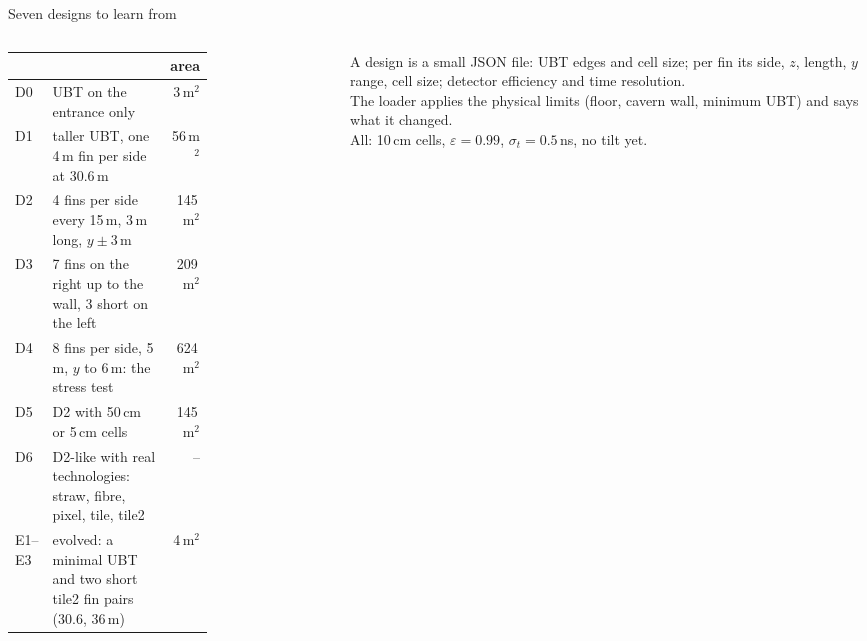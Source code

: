 \documentclass[aspectratio=169,10pt]{beamer}
\begin{document}
\begin{frame}{Seven designs to learn from}
  \begin{columns}[c]
    \begin{column}{0.55\textwidth}\footnotesize
      \begin{tabular}{@{}lp{0.62\linewidth}r@{}}
        \toprule
        & & area\\
        \midrule
        D0 & UBT on the entrance only & 3\,m$^2$\\
        D1 & taller UBT, one 4\,m fin per side at 30.6\,m & 56\,m$^2$\\
        D2 & 4 fins per side every 15\,m, 3\,m long, $y\pm3$\,m & 145\,m$^2$\\
        D3 & 7 fins on the right up to the wall, 3 short on the left & 209\,m$^2$\\
        D4 & 8 fins per side, 5\,m, $y$ to 6\,m: the stress test & 624\,m$^2$\\
        D5 & D2 with 50\,cm or 5\,cm cells & 145\,m$^2$\\
        D6 & D2-like with real technologies: straw, fibre, pixel, tile, tile2 & --\\
        E1--E3 & evolved: a minimal UBT and two short tile2 fin pairs (30.6, 36\,m) & 4\,m$^2$\\
        \bottomrule
      \end{tabular}
    \end{column}
    \begin{column}{0.42\textwidth}\footnotesize
      A design is a small JSON file: UBT edges and cell size; per fin its side, $z$, length, $y$ range, cell size; detector efficiency and time resolution.\\[2mm]
      The loader applies the physical limits (floor, cavern wall, minimum UBT) and says what it changed.\\[2mm]
      All: 10\,cm cells, $\varepsilon = 0.99$, $\sigma_t = 0.5$\,ns, no tilt yet.\\[2mm]
    \end{column}
  \end{columns}
\end{frame}

\end{document}
